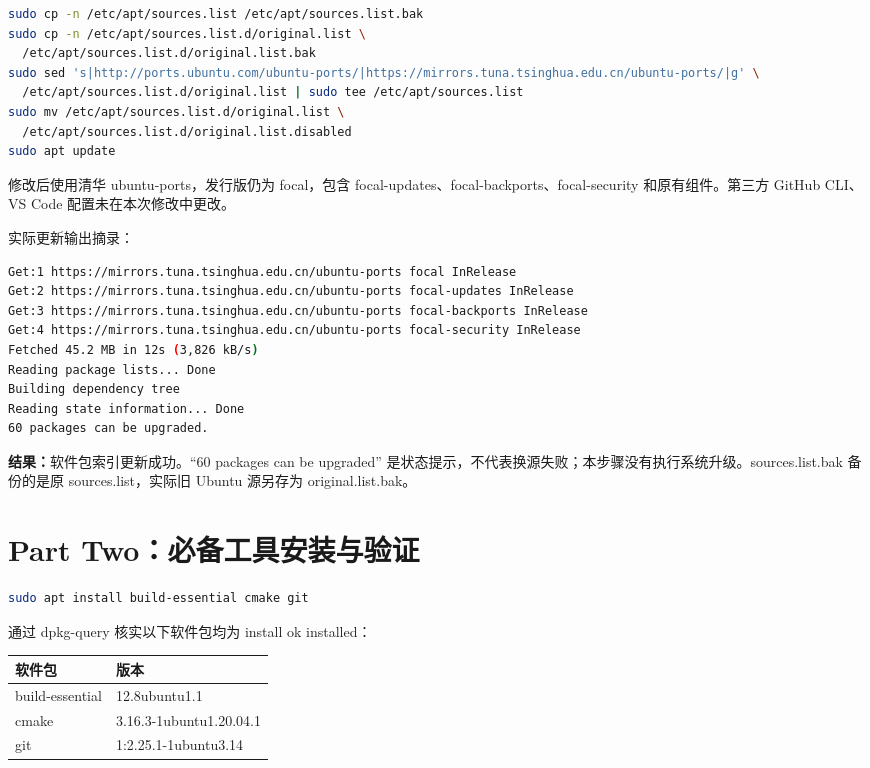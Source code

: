 \documentclass[12pt,a4paper]{ctexart}
\begin{document}
\begin{lstlisting}[language=bash]
sudo cp -n /etc/apt/sources.list /etc/apt/sources.list.bak
sudo cp -n /etc/apt/sources.list.d/original.list \
  /etc/apt/sources.list.d/original.list.bak
sudo sed 's|http://ports.ubuntu.com/ubuntu-ports/|https://mirrors.tuna.tsinghua.edu.cn/ubuntu-ports/|g' \
  /etc/apt/sources.list.d/original.list | sudo tee /etc/apt/sources.list
sudo mv /etc/apt/sources.list.d/original.list \
  /etc/apt/sources.list.d/original.list.disabled
sudo apt update
\end{lstlisting}

修改后使用清华 ubuntu-ports，发行版仍为 focal，包含 focal-updates、focal-backports、focal-security 和原有组件。第三方 GitHub CLI、VS Code 配置未在本次修改中更改。

实际更新输出摘录：
\begin{lstlisting}[language=bash]
Get:1 https://mirrors.tuna.tsinghua.edu.cn/ubuntu-ports focal InRelease
Get:2 https://mirrors.tuna.tsinghua.edu.cn/ubuntu-ports focal-updates InRelease
Get:3 https://mirrors.tuna.tsinghua.edu.cn/ubuntu-ports focal-backports InRelease
Get:4 https://mirrors.tuna.tsinghua.edu.cn/ubuntu-ports focal-security InRelease
Fetched 45.2 MB in 12s (3,826 kB/s)
Reading package lists... Done
Building dependency tree
Reading state information... Done
60 packages can be upgraded.
\end{lstlisting}

\textbf{结果：}软件包索引更新成功。``60 packages can be upgraded'' 是状态提示，不代表换源失败；本步骤没有执行系统升级。sources.list.bak 备份的是原 sources.list，实际旧 Ubuntu 源另存为 original.list.bak。

\newpage

\section{Part Two：必备工具安装与验证}

\begin{lstlisting}[language=bash]
sudo apt install build-essential cmake git
\end{lstlisting}

通过 dpkg-query 核实以下软件包均为 install ok installed：
\begin{center}
\begin{tabular}{ll}
\toprule
软件包 & 版本 \\
\midrule
build-essential & 12.8ubuntu1.1 \\
cmake & 3.16.3-1ubuntu1.20.04.1 \\
git & 1:2.25.1-1ubuntu3.14 \\
\bottomrule
\end{tabular}
\end{center}
\end{document}
